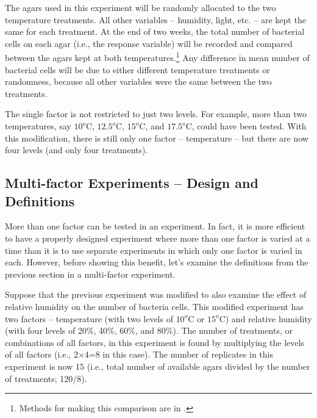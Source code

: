 \documentclass[10pt,openany]{book}\usepackage[]{graphicx}\usepackage[]{color}
\begin{document}
The agars used in this experiment will be randomly allocated to the two temperature treatments. All other variables -- humidity, light, etc. -- are kept the same for each treatment. At the end of two weeks, the total number of bacterial cells on each agar (i.e., the response variable) will be recorded and compared between the agars kept at both temperatures.\footnote{Methods for making this comparison are in .} Any difference in mean number of bacterial cells will be due to either different temperature treatments or randomness, because all other variables were the same between the two treatments.


The single factor is not restricted to just two levels. For example, more than two temperatures, say $10^{o}$C, $12.5^{o}$C, $15^{o}$C, and $17.5^{o}$C, could have been tested. With this modification, there is still only one factor -- temperature -- but there are now four levels (and only four treatments).

\subsection{Multi-factor Experiments -- Design and Definitions}
More than one factor can be tested in an experiment. In fact, it is more efficient to have a properly designed experiment where more than one factor is varied at a time than it is to use separate experiments in which only one factor is varied in each. However, before showing this benefit, let's examine the definitions from the previous section in a multi-factor experiment.

Suppose that the previous experiment was modified to also examine the effect of relative humidity on the number of bacteria cells. This modified experiment has two factors -- temperature (with two levels of $10^{o}$C or $15^{o}$C) and relative humidity (with four levels of 20\%, 40\%, 60\%, and 80\%). The number of treatments, or combinations of all factors, in this experiment is found by multiplying the levels of all factors (i.e., 2$\times$4=8 in this case). The number of replicates in this experiment is now 15 (i.e., total number of available agars divided by the number of treatments; 120/8).

\end{document}

